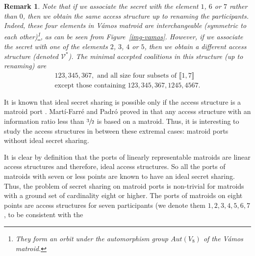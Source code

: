 \documentclass[11pt, a4paper]{kybernetika}
\newtheorem{remark}[theorem]{Remark}
\begin{document}
	\begin{remark}
		Note that if we associate the secret with the element $1$, $6$ or $7$ rather than $0$, then we obtain the same access structure up to renaming the participants. Indeed, these four elements in V\'amos matroid are interchangeable (symmetric to each other)\footnote{They form an orbit under the automorphism group $Aut(V_8)$ of the V\'amos matroid.}, as can be seen from Figure~\ref{img-vamos}. However, if we associate the secret with one of the elements $2$, $3$, $4$ or $5$, then we obtain a different access structure (denoted $\mathcal{V}^*$). The minimal accepted coalitions in this structure (up to renaming) are 
		\[
		\begin{array}{l}
			123,345,367,\text{ and all size four subsets of }\llbracket1,7\rrbracket\\
			\text{except those containing }123,345,367,1245,4567.
		\end{array}		
		\]
	\end{remark}
	
	It is known that ideal secret sharing is possible only if the access structure is a matroid port \cite{brickell1991classification}. Mart\'i-Farré and Padr\'o proved in \cite{marti2010secret} that any access structure with an information ratio less than $\sfrac32$ is based on a matroid. Thus, it is interesting to study the access structures in between these extremal cases: matroid ports without ideal secret sharing.
	
	It is clear by definition that the ports of linearly representable matroids are linear access structures and therefore, ideal access structures. So all the ports of matroids with seven or less points are known to have an ideal secret sharing. Thus, the problem of secret sharing on matroid ports is non-trivial for matroids with a ground set of cardinality eight or higher. The ports of matroids on eight points are access structures for seven participants (we denote them $1,2,3,4,5,6,7$, to be consistent with the
	
\end{document}
